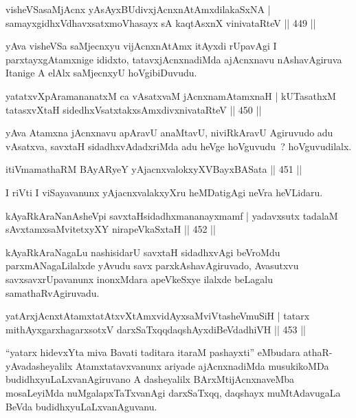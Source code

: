 \begin{shl}
visheVSasaMjAcnx yA\s sAyxBUdivxjAcnxnAtAmxdilakaSxNA |
samayxgidhxVdhavxsatxmoVhasayx sA kaqtAsxnX vinivataRteV \hfill  || 449 ||
\end{shl}

\begin{artha}
yAva visheVSa saMjecnxyu vijAcnxnAtAmx itAyxdi rUpavAgi I parxtayxgAtamxnige ididxto, tatavxjAcnxnadiMda ajAcnxnavu nAshavAgiruva Itanige A elAlx saMjecnxyU hoVgibiDuvudu.
\end{artha}

\begin{shl}
yatatxvXpAramananatxM ca vAsatxvaM jAcnxnamAtamxnaH |
kUTasathxM tatasxvXtaH sidedhxVsatxtakxsAmxdivxnivataRteV \hfill  || 450 ||
\end{shl}

\begin{artha}
yAva Atamxna jAcnxnavu apAravU anaMtavU, niviRkAravU Agiruvudo adu vAsatxva, savxtaH sidadhxvAdadxriMda adu heVge hoVguvudu~? hoVguvudilalx.
\end{artha}

\begin{shl}
itiVmamathaRM BAyARyeY yAjacnxvalokxyXV\s BayxBASata \hfill  || 451 ||
\end{shl}

\begin{artha}
I riVti I viSayavanunx yAjacnxvalakxyXru heMDatigAgi neVra heVLidaru.
\end{artha}

\begin{shl}
kAyaRkAraNanAsheV\s pi savxtaHsidadhxmananayxmamf |
yadavxsutx tadalaM sAvxtamxsaMvitetxyXY nirapeVkaSxtaH \hfill  || 452 ||
\end{shl}

\begin{artha}
kAyaRkAraNagaLu nashisidarU savxtaH sidadhxvAgi beVroMdu parxmANagaLilalxde yAvudu savx parxkAshavAgiruvado, Avasutxvu savxsavxrUpavanunx inonxMdara apeVkeSxye ilalxde beLagalu samathaRvAgiruvadu.
\end{artha}

\begin{shl}
yatArxjAcnxtAtamxtatAtxvXtAmx\s vidAyxsaMviVtasheVmuSiH |
tatarx mithAyxgarxhagarxsotxV darxSaTxqqdaqshAyxdiBeVdadhiVH \hfill  || 453 ||
\end{shl}

\begin{artha}
``yatarx hidevxYta miva Bavati taditara itaraM pashayxti'' eMbudara   athaR- yAvadasheyalilx Atamxtatavxvanunx ariyade ajAcnxnadiMda   musukikoMDa budidhxyuLaLxvanAgiruvano A dasheyalilx   BArxMtijAcnxnaveMba mosaLeyiMda nuMgalapxTaTxvanAgi darxSaTxqq,   daqshayx muMtAdavugaLa BeVda budidhxyuLaLxvanAguvanu.
\end{artha}

